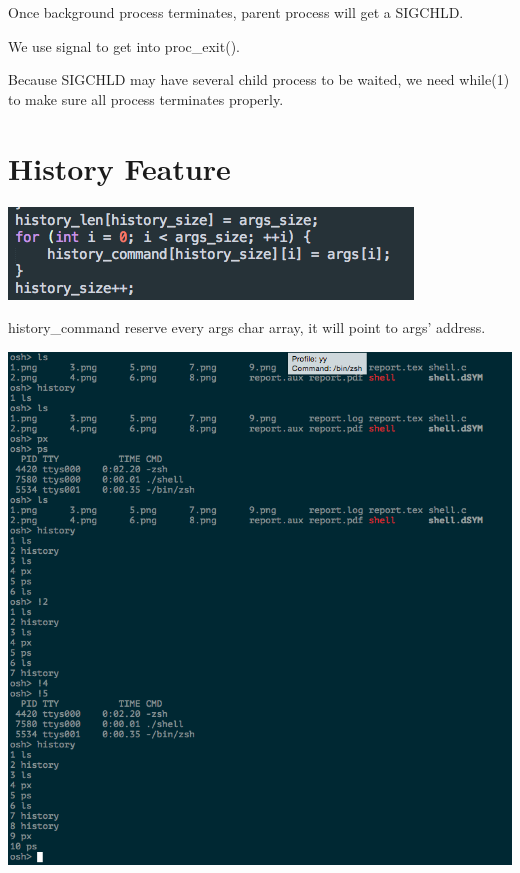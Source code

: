 \documentclass{article}
\begin{document}
Once background process terminates, parent process will get a SIGCHLD.

We use signal to get into proc\_exit(). 

Because SIGCHLD may have several child process to be waited, we need while(1) to make sure all process terminates properly.

\section{History Feature}

\includegraphics[scale=0.5]{pics/9.png}

history\_command reserve every args char array, it will point to args' address.


\includegraphics[scale=0.5]{pics/11.png}
\end{document}
